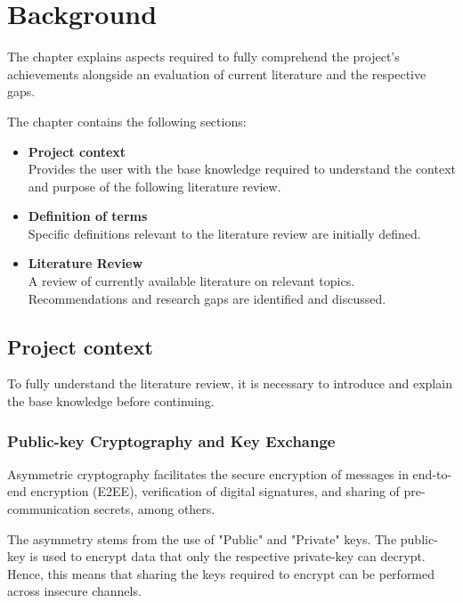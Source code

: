 \chapter{Background}
\label{cha:LiteratureReview}

The chapter explains aspects required to fully comprehend the project's achievements alongside an evaluation of current literature and the respective gaps.

The chapter contains the following sections:

\begin{itemize}
    \item \textbf{Project context} \\ 
    Provides the user with the base knowledge required to understand the context and purpose of the following literature review.
    
    \item \textbf{Definition of terms}\\
    Specific definitions relevant to the literature review are initially defined.
    
    \item \textbf{Literature Review} \\
    A review of currently available literature on relevant topics. Recommendations and research gaps are identified and discussed.

\end{itemize}

\section{Project context}

To fully understand the literature review, it is necessary to introduce and explain the base knowledge before continuing.

\subsection*{Public-key Cryptography and Key Exchange}

Asymmetric cryptography facilitates the secure encryption of messages in end-to-end encryption (E2EE), verification of digital signatures, and sharing of pre-communication secrets, among others. 

The asymmetry stems from the use of "Public" and "Private" keys. The public-key is used to encrypt data that only the respective private-key can decrypt. Hence, this means that sharing the keys required to encrypt can be performed across insecure channels.


